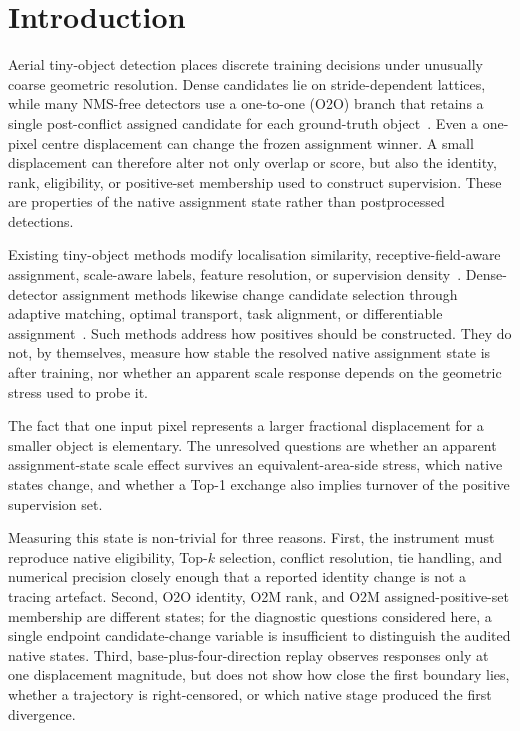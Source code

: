 \section{Introduction}

Aerial tiny-object detection places discrete training decisions under unusually coarse geometric resolution. Dense candidates lie on stride-dependent lattices, while many NMS-free detectors use a one-to-one (O2O) branch that retains a single post-conflict assigned candidate for each ground-truth object~\cite{wang2021defcn,sun2021onenet,wang2024yolov10,jocher2026yolo26}. Even a one-pixel centre displacement can change the frozen assignment winner. A small displacement can therefore alter not only overlap or score, but also the identity, rank, eligibility, or positive-set membership used to construct supervision. These are properties of the native assignment state rather than postprocessed detections.

Existing tiny-object methods modify localisation similarity, receptive-field-aware assignment, scale-aware labels, feature resolution, or supervision density~\cite{wang2021nwd,xu2022rfla,shi2024simd,xu2023dcfl,lin2026ngla,zhang2026vala,tian2026nbddla}. Dense-detector assignment methods likewise change candidate selection through adaptive matching, optimal transport, task alignment, or differentiable assignment~\cite{zhang2020atss,kim2020paa,ge2021ota,feng2021tood,zhang2019freeanchor,zhu2020autoassign}. Such methods address how positives should be constructed. They do not, by themselves, measure how stable the resolved native assignment state is after training, nor whether an apparent scale response depends on the geometric stress used to probe it.

The fact that one input pixel represents a larger fractional displacement for a smaller object is elementary. The unresolved questions are whether an apparent assignment-state scale effect survives an equivalent-area-side stress, which native states change, and whether a Top-1 exchange also implies turnover of the positive supervision set.

Measuring this state is non-trivial for three reasons. First, the instrument must reproduce native eligibility, Top-$k$ selection, conflict resolution, tie handling, and numerical precision closely enough that a reported identity change is not a tracing artefact. Second, O2O identity, O2M rank, and O2M assigned-positive-set membership are different states; for the diagnostic questions considered here, a single endpoint candidate-change variable is insufficient to distinguish the audited native states. Third, base-plus-four-direction replay observes responses only at one displacement magnitude, but does not show how close the first boundary lies, whether a trajectory is right-censored, or which native stage produced the first divergence.

